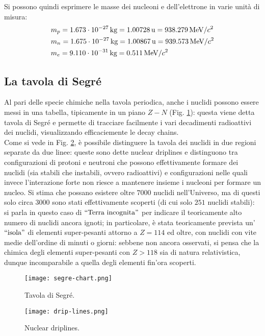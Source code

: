 Si possono quindi esprimere le masse dei nucleoni e dell'elettrone in varie unità di misura:
\begin{equation*}
	\begin{split}
		&m_p = 1.673\cdot10^{-27}\,\text{kg} = 1.00728\,\text{u} = 938.279 \,\text{MeV}/c^2\\
		&m_n = 1.675\cdot10^{-27}\,\text{kg} = 1.00867\,\text{u} = 939.573 \,\text{MeV}/c^2\\
		&m_e = 9.110\cdot10^{-31}\,\text{kg} = 0.511\,\text{MeV}/c^2
	\end{split}
\end{equation*}

\subsection{La tavola di Segré}

Al pari delle specie chimiche nella tavola periodica, anche i nuclidi possono essere messi in una tabella, tipicamente in un piano $ Z - N $ (Fig. \ref{segre-chart}): questa viene detta tavola di Segré e permette di tracciare facilmente i vari decadimenti radioattivi dei nuclidi, visualizzando efficaciemente le decay chains.\\
Come si vede in Fig. \ref{drip-lines}, è possibile distinguere la tavola dei nuclidi in due regioni separate da due linee: queste sono dette nuclear driplines e distinguono tra configurazioni di protoni e neutroni che possono effettivamente formare dei nuclidi (sia stabili che instabili, ovvero radioattivi) e configurazioni nelle quali invece l'interazione forte non riesce a mantenere insieme i nucleoni per formare un nucleo. Si stima che possano esistere oltre $ 7000 $ nuclidi nell'Universo, ma di questi solo circa $ 3000 $ sono stati effettivamente scoperti (di cui solo $ 251 $ nuclidi stabili): si parla in questo caso di $ ``\text{Terra incognita}" $ per indicare il teoricamente alto numero di nuclidi ancora ignoti; in particolare, è stata teoricamente prevista un'$ ``\text{isola}" $ di elementi super-pesanti attorno a $ Z = 114 $ ed oltre, con nuclidi con vite medie dell'ordine di minuti o giorni: sebbene non ancora osservati, si pensa che la chimica degli elementi super-pesanti con $ Z > 118 $ sia di natura relativistica, dunque incomparabile a quella degli elementi fin'ora scoperti.

\begin{figure}
  \centering
  \texttt{[image: segre-chart.png]}
  \caption{Tavola di Segré.}
  \label{segre-chart}
\end{figure}
\begin{figure}
  \centering
  \texttt{[image: drip-lines.png]}
  \caption{Nuclear driplines.}
  \label{drip-lines}
\end{figure}

